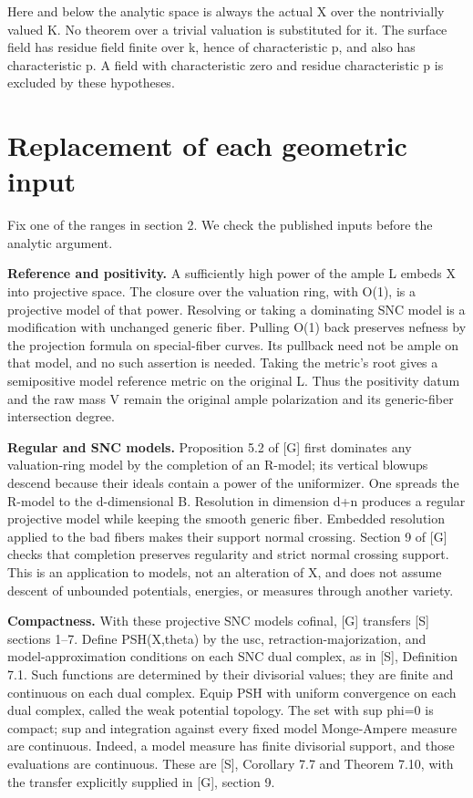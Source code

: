 \documentclass[11pt]{article}
\begin{document}
Here and below the analytic space is always the actual X over the nontrivially valued K. No theorem over a trivial valuation is substituted for it. The surface field has residue field finite over k, hence of characteristic p, and also has characteristic p. A field with characteristic zero and residue characteristic p is excluded by these hypotheses.

\section{Replacement of each geometric input}

Fix one of the ranges in section 2. We check the published inputs before the analytic argument.

\textbf{Reference and positivity.} A sufficiently high power of the ample L embeds X into projective space. The closure over the valuation ring, with O(1), is a projective model of that power. Resolving or taking a dominating SNC model is a modification with unchanged generic fiber. Pulling O(1) back preserves nefness by the projection formula on special-fiber curves. Its pullback need not be ample on that model, and no such assertion is needed. Taking the metric's root gives a semipositive model reference metric on the original L. Thus the positivity datum and the raw mass V remain the original ample polarization and its generic-fiber intersection degree.

\textbf{Regular and SNC models.} Proposition 5.2 of [G] first dominates any valuation-ring model by the completion of an R-model; its vertical blowups descend because their ideals contain a power of the uniformizer. One spreads the R-model to the d-dimensional B. Resolution in dimension d+n produces a regular projective model while keeping the smooth generic fiber. Embedded resolution applied to the bad fibers makes their support normal crossing. Section 9 of [G] checks that completion preserves regularity and strict normal crossing support. This is an application to models, not an alteration of X, and does not assume descent of unbounded potentials, energies, or measures through another variety.

\textbf{Compactness.} With these projective SNC models cofinal, [G] transfers [S] sections 1--7. Define PSH(X,theta) by the usc, retraction-majorization, and model-approximation conditions on each SNC dual complex, as in [S], Definition 7.1. Such functions are determined by their divisorial values; they are finite and continuous on each dual complex. Equip PSH with uniform convergence on each dual complex, called the weak potential topology. The set with sup phi=0 is compact; sup and integration against every fixed model Monge-Ampere measure are continuous. Indeed, a model measure has finite divisorial support, and those evaluations are continuous. These are [S], Corollary 7.7 and Theorem 7.10, with the transfer explicitly supplied in [G], section 9.
\end{document}
